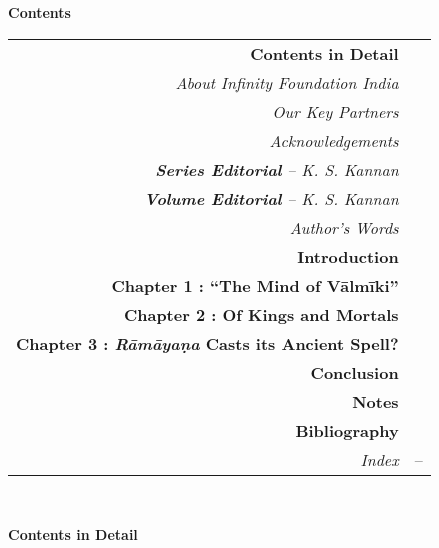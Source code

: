 \thispagestyle{empty}


\hfill{\LARGE\bfseries Contents}
\vskip 20pt

{\renewcommand{\arraystretch}{1.15}
\begin{longtable}[r]{rl@{}}
{{\bf Contents in Detail}} & \pageref{cid}\\[7pt]
{{\sl About Infinity Foundation India}} & \pageref{about}\\[7pt]
{{\sl Our Key Partners}} & \pageref{keypartners}\\[7pt]
{{\sl Acknowledgements}} & \pageref{ack2}\\[7pt]
{{\sl{\bfseries Series Editorial}  – K. S. Kannan}} & \pageref{series_editorial}\\[7pt]
{{\sl{\bfseries Volume Editorial}  – K. S. Kannan}} & \pageref{volume_editorial}\\[7pt]
{{\sl Author's Words}} & \pageref{authors-words}\\[7pt]
{{\bf Introduction}} & \pageref{introduction}\\[7pt]
{{\bfseries Chapter 1 : “The Mind of Vālmīki”}} & \pageref{chapter1}\\[7pt]
{{\bfseries Chapter 2 : Of Kings and Mortals}} & \pageref{chapter2}\\[7pt]
{{\bfseries Chapter 3 : {\sl\bfseries Rāmāyaṇa} Casts its Ancient Spell?}} & \pageref{chapter3}\\[7pt]
{{\bf Conclusion}} & \pageref{conclusion}\\[7pt]
{{\bf Notes}} & \pageref{notes}\\[7pt]
{{\bf Bibliography}} & \pageref{bibliography}\\[7pt]
{{\sl Index}} & \pageref{index}--\pageref{indexend}
\end{longtable}}

\newpage

~\phantom{a}

\vskip 57pt

\thispagestyle{empty}
\hfill{\LARGE\bfseries Contents in Detail}

\vskip 40pt

\label{cid}

